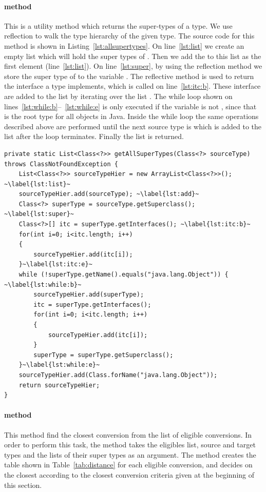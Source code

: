 \paragraph{ method} This is a utility method which returns the super-types of a type. We use reflection to walk the type hierarchy of the given type. The source code for this method is shown in Listing~\ref{lst:allsupertypes}.
On line~\ref{lst:list} we create an empty list which will hold the super types of .
Then we add the  to this list as the first element (line~\ref{lst:list}). 
On line~\ref{lst:super}, by using the reflection method  we store the super type of  to the variable . 
The reflective method  is used to return the interface a type implements, which is called on line~\ref{lst:itc:b}. These interface are added to the list  by iterating over the list .
The while loop shown on lines~\ref{lst:while:b}--~\ref{lst:while:e} is only executed if the variable  is not , since that is the root type for all objects in Java.
Inside the while loop the same operations described above are performed until the next source type is  which is added to the list after the loop terminates.
Finally the  list is returned. 

\begin{lstlisting}[float, caption={The source code for the \lstinln{getAllSuperTypes} method}, label={lst:allsupertypes}]
private static List<Class<?>> getAllSuperTypes(Class<?> sourceType) throws ClassNotFoundException {
	List<Class<?>> sourceTypeHier = new ArrayList<Class<?>>(); ~\label{lst:list}~
	sourceTypeHier.add(sourceType); ~\label{lst:add}~
	Class<?> superType = sourceType.getSuperclass(); ~\label{lst:super}~
	Class<?>[] itc = superType.getInterfaces(); ~\label{lst:itc:b}~
	for(int i=0; i<itc.length; i++)
	{
		sourceTypeHier.add(itc[i]);
	}~\label{lst:itc:e}~
	while (!superType.getName().equals("java.lang.Object")) { ~\label{lst:while:b}~
		sourceTypeHier.add(superType);
		itc = superType.getInterfaces();
		for(int i=0; i<itc.length; i++)
		{
			sourceTypeHier.add(itc[i]);
		}
		superType = superType.getSuperclass();
	}~\label{lst:while:e}~
	sourceTypeHier.add(Class.forName("java.lang.Object"));
	return sourceTypeHier;
}
\end{lstlisting}

\paragraph{ method} This method find the closest conversion from the list of eligible conversions. 
In order to perform this task, the method takes the eligibles list, source and target types and the lists of their super types as an argument. 
The method creates the table shown in Table~\ref{tab:distance} for each eligible conversion, and decides on the closest according to the closest conversion criteria given at the beginning of this section. 

